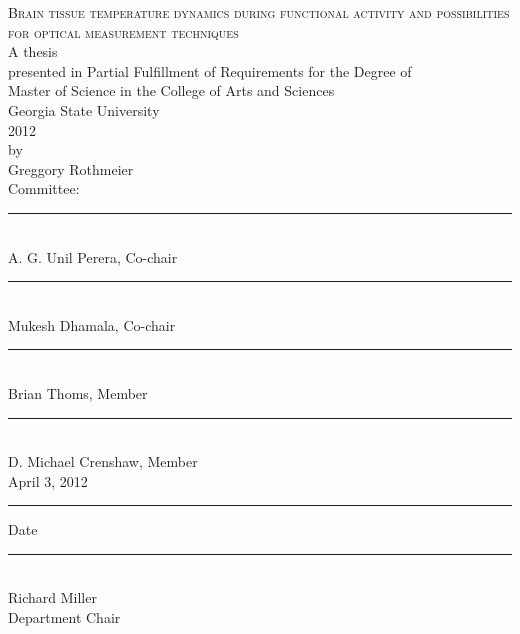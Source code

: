 \documentclass[11pt]{report}
\newcommand{\signhere}{\vspace{0.3in}\rule{\linewidth}{0.5mm}\\}
\begin{document}
\thispagestyle{empty}
\centering
  \textsc{Brain tissue temperature dynamics during functional activity and possibilities for optical measurement techniques}\\
  \vspace{0.1in}
  A thesis\\
  presented in Partial Fulfillment of Requirements for the Degree of \\ Master of Science in the College of Arts and Sciences \\
  Georgia State University\\
  2012\\
  by\\
  Greggory Rothmeier\\
  \vspace*{\fill}
  Committee:\\
  \begin{singlespace}
    \signhere
    A. G. Unil Perera, Co-chair\\
    \signhere
    Mukesh Dhamala, Co-chair\\
    \signhere
    Brian Thoms, Member\\
    \signhere
    D. Michael Crenshaw, Member \\
    \vspace{0.1in}
    April 3, 2012\\
    \rule{\linewidth}{0.5mm}
    Date\\
    \signhere
    Richard Miller\\
    Department Chair\\
  \end{singlespace}
\end{document}
